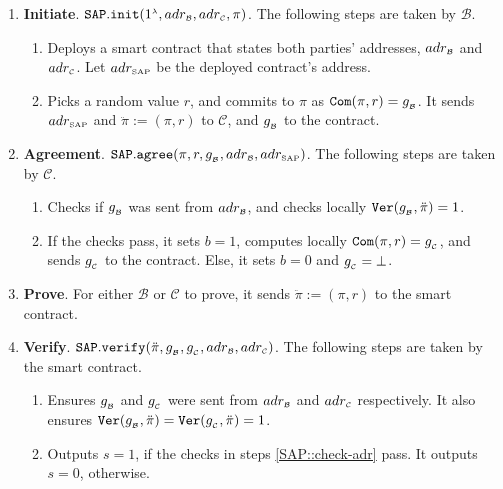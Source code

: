 {\small{
 \begin{enumerate}
 \item\textbf{Initiate}. $\mathtt{SAP.init}(1^{\scriptscriptstyle\lambda}, adr_{\scriptscriptstyle\mathcal{\scriptscriptstyle B}}, adr_{\scriptscriptstyle\mathcal{C}}, \pi )$.
%
 The following steps are taken by  $\mathcal B$.
  \begin{enumerate}
  \item\label{SAP::deploy-contract}  Deploys a smart contract that   states both parties'  addresses, $adr_{\scriptscriptstyle\mathcal{B}}$ and  $adr_{\scriptscriptstyle\mathcal{C}}$. Let $adr_{\scriptscriptstyle\text{SAP}}$ be the deployed contract's address. 
%
   \item  Picks a random value $r$, and commits to $\pi$ as $\mathtt{Com}(\pi, r)=g_{_{\scriptscriptstyle \mathcal{B}}}$.
    It sends $adr_{\scriptscriptstyle\text{SAP}}$ and $\ddot{\pi}:=(\pi, r)$  to  $\mathcal C$, and $g_{_{\scriptscriptstyle\mathcal B}}$ to the contract. 
    \end{enumerate}
    \item\textbf{Agreement}. $\mathtt{SAP.agree}(\pi, r, g_{_{\scriptscriptstyle \mathcal{B}}}, adr_{\scriptscriptstyle\mathcal{B}}, adr_{\scriptscriptstyle\text{SAP}})$.
%
     The following steps are taken by  $\mathcal C$.
     \begin{enumerate}
   \item Checks  if $g_{_{\scriptscriptstyle \mathcal{B}}}$ was  sent  from $adr_{\scriptscriptstyle \mathcal{B}}$, and checks locally $\mathtt{Ver}(g_{_{\scriptscriptstyle\mathcal B}}, \ddot{\pi})=1$.
   \item If the checks pass, it sets $b=1$,    computes locally $\mathtt{Com}(\pi, r)=g_{_{\scriptscriptstyle\mathcal C}}$, and sends $g_{_{\scriptscriptstyle\mathcal C}}$ to the contract. Else, it sets $b=0$ and $g_{_{\scriptscriptstyle\mathcal C}}=\bot$.
    \end{enumerate}
%
   \item\textbf{Prove}. For either $\mathcal B$ or $\mathcal C$ to prove, it sends $\ddot{\pi}:=(\pi, r)$  to the smart contract. 
 \item\textbf{Verify}. $\mathtt{SAP.verify}(\ddot{\pi}, g_{_{\scriptscriptstyle\mathcal B}},g_{_{\scriptscriptstyle\mathcal C}}, adr_{\scriptscriptstyle\mathcal{B}}, adr_{\scriptscriptstyle\mathcal{C}})$. 
 The following steps are taken by the smart contract.
   \begin{enumerate}
   
\item\label{SAP::check-adr} Ensures $g_{_{\scriptscriptstyle\mathcal B}}$ and $g_{_{\scriptscriptstyle\mathcal C}}$ were sent from   $adr_{\scriptscriptstyle \mathcal{B}}$ and  $adr_{\scriptscriptstyle \mathcal{C}}$  respectively. 
%
It also ensures $\mathtt{Ver}(g_{_{\scriptscriptstyle\mathcal B}},\ddot{\pi})=\mathtt{Ver}(g_{_{\scriptscriptstyle\mathcal C}},\ddot{\pi}) =1$.
   
   \item Outputs $s=1$, if the checks in steps \ref{SAP::check-adr} pass. It outputs $s=0$, otherwise.
    \end{enumerate}
 \end{enumerate}
 }
 }

